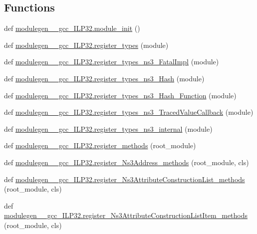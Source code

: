 \subsection*{Functions}
\begin{DoxyCompactItemize}
\item 
def \hyperlink{namespacemodulegen____gcc__ILP32_adeca9ed3c99593bd5eb3b0bd7981c321}{modulegen\+\_\+\+\_\+gcc\+\_\+\+I\+L\+P32.\+module\+\_\+init} ()
\item 
def \hyperlink{namespacemodulegen____gcc__ILP32_af565b2741bb1cd768d289459114389b9}{modulegen\+\_\+\+\_\+gcc\+\_\+\+I\+L\+P32.\+register\+\_\+types} (module)
\item 
def \hyperlink{namespacemodulegen____gcc__ILP32_aab873702fb2d41d9a78db27492ae87a5}{modulegen\+\_\+\+\_\+gcc\+\_\+\+I\+L\+P32.\+register\+\_\+types\+\_\+ns3\+\_\+\+Fatal\+Impl} (module)
\item 
def \hyperlink{namespacemodulegen____gcc__ILP32_a0bce51bcadf44c501181b3a56b927a40}{modulegen\+\_\+\+\_\+gcc\+\_\+\+I\+L\+P32.\+register\+\_\+types\+\_\+ns3\+\_\+\+Hash} (module)
\item 
def \hyperlink{namespacemodulegen____gcc__ILP32_af8a17079f3fe7bb312bb8a09266937fa}{modulegen\+\_\+\+\_\+gcc\+\_\+\+I\+L\+P32.\+register\+\_\+types\+\_\+ns3\+\_\+\+Hash\+\_\+\+Function} (module)
\item 
def \hyperlink{namespacemodulegen____gcc__ILP32_a1410eba4e1bf09d877cd7bd0ae8e66ef}{modulegen\+\_\+\+\_\+gcc\+\_\+\+I\+L\+P32.\+register\+\_\+types\+\_\+ns3\+\_\+\+Traced\+Value\+Callback} (module)
\item 
def \hyperlink{namespacemodulegen____gcc__ILP32_abcdfa1e2ddcdfff645f539fa053df219}{modulegen\+\_\+\+\_\+gcc\+\_\+\+I\+L\+P32.\+register\+\_\+types\+\_\+ns3\+\_\+internal} (module)
\item 
def \hyperlink{namespacemodulegen____gcc__ILP32_a94ccb7f04a4251f5353b68c8c69cb5fa}{modulegen\+\_\+\+\_\+gcc\+\_\+\+I\+L\+P32.\+register\+\_\+methods} (root\+\_\+module)
\item 
def \hyperlink{namespacemodulegen____gcc__ILP32_afc9e83375dc30250cd5d7973f09379a5}{modulegen\+\_\+\+\_\+gcc\+\_\+\+I\+L\+P32.\+register\+\_\+\+Ns3\+Address\+\_\+methods} (root\+\_\+module, cls)
\item 
def \hyperlink{namespacemodulegen____gcc__ILP32_a8e5f62edcbcf1da6ad9a86c08224bd88}{modulegen\+\_\+\+\_\+gcc\+\_\+\+I\+L\+P32.\+register\+\_\+\+Ns3\+Attribute\+Construction\+List\+\_\+methods} (root\+\_\+module, cls)
\item 
def \hyperlink{namespacemodulegen____gcc__ILP32_ace7f1f66407f5bc96929772acd5a537c}{modulegen\+\_\+\+\_\+gcc\+\_\+\+I\+L\+P32.\+register\+\_\+\+Ns3\+Attribute\+Construction\+List\+Item\+\_\+methods} (root\+\_\+module, cls)

\end{DoxyCompactItemize}
